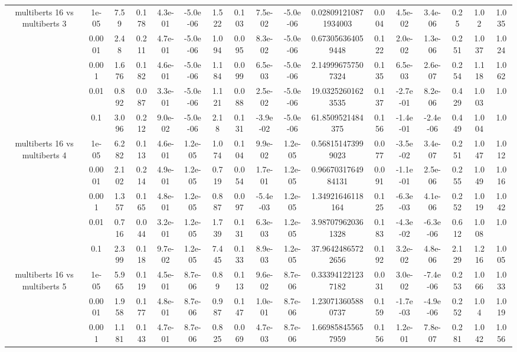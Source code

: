 \begin{tabular}{|c|c|c|c|c|c|c|c|c|c|c|c|c|c|c|c|c|}
\hline
\multirow{5}{*}{multiberts 16 vs multiberts 3} & 1e-05 & 7.59 & 0.178 & 4.3e-01 & -5.0e-06 & 1.522 & 0.103 & 7.5e-02 & -5.0e-06 & 0.028091210871934003 & 0.004 & 4.5e-02 & 3.4e-06 & 0.25 & 1.02 & 1.035 \\
 & 0.0001 & 2.48 & 0.211 & 4.7e-01 & -5.0e-06 & 1.094 & 0.095 & 8.3e-02 & -5.0e-06 & 0.673056364059448 & 0.122 & 2.0e-02 & 1.3e-06 & 0.251 & 1.037 & 1.024 \\
 & 0.001 & 1.676 & 0.182 & 4.6e-01 & -5.0e-06 & 1.184 & 0.099 & 6.5e-03 & -5.0e-06 & 2.149996757507324 & 0.135 & 6.5e-03 & 2.6e-07 & 0.254 & 1.118 & 1.062 \\
 & 0.01 & 0.892 & 0.087 & 3.3e-01 & -5.0e-06 & 1.121 & 0.088 & 2.5e-02 & -5.0e-06 & 19.03252601623535 & 0.137 & -2.7e-01 & 8.2e-06 & 0.429 & 1.003 & 1.0 \\
 & 0.1 & 3.096 & 0.212 & 9.0e-02 & -5.0e-06 & 2.18 & 0.131 & -3.9e-02 & -5.0e-06 & 61.8509521484375 & 0.156 & -1.4e-01 & -2.4e-06 & 0.449 & 1.004 & 1.0 \\
\hline
\multirow{5}{*}{multiberts 16 vs multiberts 4} & 1e-05 & 6.282 & 0.113 & 4.6e-01 & 1.2e-05 & 1.074 & 0.104 & 9.9e-02 & 1.2e-05 & 0.568151473999023 & 0.077 & -3.5e-02 & 3.4e-07 & 0.251 & 1.047 & 1.012 \\
 & 0.0001 & 2.102 & 0.214 & 4.9e-01 & 1.2e-05 & 0.719 & 0.054 & 1.7e-01 & 1.2e-05 & 0.9667031764984131 & 0.091 & -1.1e-01 & 2.5e-06 & 0.255 & 1.049 & 1.016 \\
 & 0.001 & 1.357 & 0.165 & 4.8e-01 & 1.2e-05 & 0.887 & 0.097 & -5.4e-03 & 1.2e-05 & 1.34921646118164 & 0.125 & -6.3e-03 & 4.1e-06 & 0.252 & 1.019 & 1.042 \\
 & 0.01 & 0.716 & 0.044 & 3.2e-01 & 1.2e-05 & 1.739 & 0.131 & 6.3e-03 & 1.2e-05 & 3.987079620361328 & 0.183 & -4.3e-02 & -6.3e-06 & 0.612 & 1.008 & 1.0 \\
 & 0.1 & 2.399 & 0.118 & 9.7e-02 & 1.2e-05 & 7.445 & 0.133 & 8.9e-03 & 1.2e-05 & 37.96424865722656 & 0.192 & 3.2e-02 & 4.8e-06 & 2.129 & 1.216 & 1.005 \\
\hline
\multirow{5}{*}{multiberts 16 vs multiberts 5} & 1e-05 & 5.965 & 0.119 & 4.5e-01 & 8.7e-06 & 0.89 & 0.113 & 9.6e-02 & 8.7e-06 & 0.333941221237182 & 0.031 & 3.0e-02 & -7.4e-06 & 0.253 & 1.066 & 1.033 \\
 & 0.0001 & 1.958 & 0.177 & 4.8e-01 & 8.7e-06 & 0.987 & 0.147 & 1.0e-01 & 8.7e-06 & 1.230713605880737 & 0.159 & -1.7e-03 & -4.9e-06 & 0.252 & 1.04 & 1.019 \\
 & 0.001 & 1.181 & 0.143 & 4.7e-01 & 8.7e-06 & 0.825 & 0.069 & 4.7e-03 & 8.7e-06 & 1.669858455657959 & 0.156 & 1.2e-01 & 7.8e-07 & 0.281 & 1.042 & 1.056 \\

\end{tabular}

